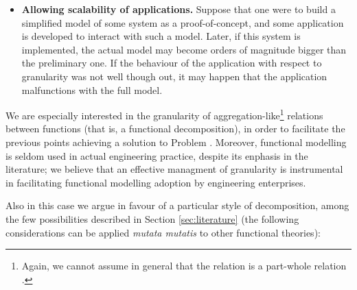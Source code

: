 \documentclass[
]{ceurart}
\begin{document}
\begin{itemize}
    \item \textbf{Allowing scalability of applications.} Suppose that one were to build a simplified model of some system as a proof-of-concept, and some application is developed to interact with such a model. Later, if this system is implemented, the actual model may become orders of magnitude bigger than the preliminary one. If the behaviour of the application with respect to granularity was not well though out, it may happen that the application malfunctions with the full model.    
\end{itemize}

We are especially interested in the granularity of aggregation-like\footnote{Again, we cannot assume in general that the relation is a part-whole relation \cite{vermaasFormalImpossibilityAnalysing2013}.} relations between functions (that is, a functional decomposition), in order to facilitate the previous points achieving a solution to Problem . Moreover, functional modelling is seldom used in actual engineering practice, despite its enphasis in the literature; we believe that an effective managment of granularity is instrumental in facilitating functional modelling adoption by engineering enterprises.

Also in this case we argue in favour of a particular style of decomposition, among the few possibilities described in Section \ref{sec:literature} (the following considerations can be applied \textit{mutata mutatis} to other functional theories):
\end{document}
